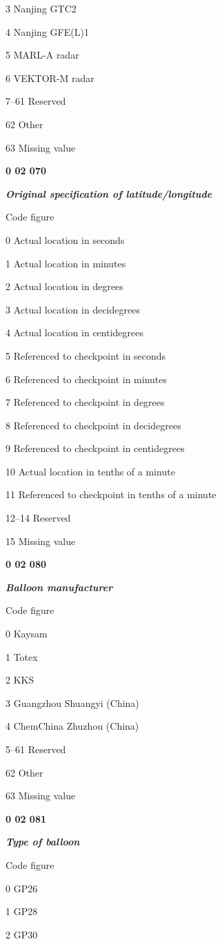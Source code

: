 3 Nanjing GTC2

4 Nanjing GFE(L)1

5 MARL-A radar

6 VEKTOR-M radar

7--61 Reserved

62 Other

63 Missing value

\textbf{0 02 070}

\emph{\textbf{Original specification of latitude/longitude}}

Code figure

0 Actual location in seconds

1 Actual location in minutes

2 Actual location in degrees

3 Actual location in decidegrees

4 Actual location in centidegrees

5 Referenced to checkpoint in seconds

6 Referenced to checkpoint in minutes

7 Referenced to checkpoint in degrees

8 Referenced to checkpoint in decidegrees

9 Referenced to checkpoint in centidegrees

10 Actual location in tenths of a minute

11 Referenced to checkpoint in tenths of a minute

12--14 Reserved

15 Missing value

\textbf{0 02 080}

\emph{\textbf{Balloon manufacturer}}

Code figure

0 Kaysam

1 Totex

2 KKS

3 Guangzhou Shuangyi (China)

4 ChemChina Zhuzhou (China)

5--61 Reserved

62 Other

63 Missing value

\textbf{0 02 081}

\emph{\textbf{Type of balloon}}

Code figure

0 GP26

1 GP28

2 GP30

